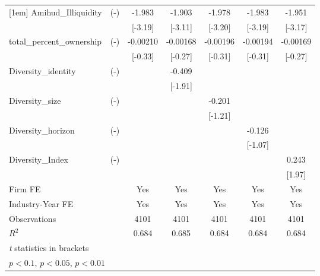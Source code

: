 {\begin{tabular}{lc*{5}{c}}
[1em]
Amihud\_Illiquidity&    (-)     &      -1.983\sym{***}&      -1.903\sym{***}&      -1.978\sym{***}&      -1.983\sym{***}&      -1.951\sym{***}\\
            &            &     [-3.19]         &     [-3.11]         &     [-3.20]         &     [-3.19]         &     [-3.17]         \\
[1em]
total\_percent\_ownership&    (-)     &    -0.00210         &    -0.00168         &    -0.00196         &    -0.00194         &    -0.00169         \\
            &            &     [-0.33]         &     [-0.27]         &     [-0.31]         &     [-0.31]         &     [-0.27]         \\
[1em]
Diversity\_identity&    (-)     &                     &      -0.409\sym{*}  &                     &                     &                     \\
            &            &                     &     [-1.91]         &                     &                     &                     \\
[1em]
Diversity\_size&    (-)     &                     &                     &      -0.201         &                     &                     \\
            &            &                     &                     &     [-1.21]         &                     &                     \\
[1em]
Diversity\_horizon&    (-)     &                     &                     &                     &      -0.126         &                     \\
            &            &                     &                     &                     &     [-1.07]         &                     \\
[1em]
Diversity\_Index&    (-)     &                     &                     &                     &                     &       0.243\sym{**} \\
            &            &                     &                     &                     &                     &      [1.97]         \\
\hline
Firm FE     &            &         Yes         &         Yes         &         Yes         &         Yes         &         Yes         \\
Industry-Year FE&            &         Yes         &         Yes         &         Yes         &         Yes         &         Yes         \\
Observations&            &        4101         &        4101         &        4101         &        4101         &        4101         \\
$ R^2 $     &            &       0.684         &       0.685         &       0.684         &       0.684         &       0.684         \\
\hline\hline
\multicolumn{7}{l}{\footnotesize \textit{t} statistics in brackets}\\
\multicolumn{7}{l}{\footnotesize \sym{*} \(p<0.1\), \sym{**} \(p<0.05\), \sym{***} \(p<0.01\)}\\
\end{tabular}
}
